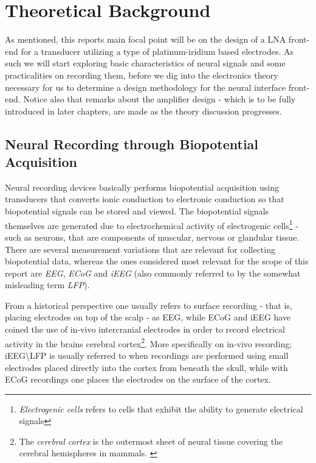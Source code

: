 \chapter{Theoretical Background}
\label{chap:two}
 
 As mentioned, this reports main focal point will be on the design of a \acs{LNA} front-end for a transducer utilizing a type of platinum-iridium based electrodes. 
 As such we will start exploring basic characteristics of neural signals and some practicalities on recording them, before we dig into the electronics theory necessary for us to determine a design methodology for the neural interface front-end. Notice also that remarks about the amplifier design - which is to be fully introduced in later chapters, are made as the theory discussion progresses.
 
  \section{Neural Recording through Biopotential Acquisition}
  \label{sec:biopotential-aquisition}
  Neural recording devices basically performs biopotential acquisition using transducers that converts ionic conduction to electronic conduction so that biopotential 
  signals can be stored and viewed. The biopotential signals themselves are generated due to electrochemical activity of electrogenic cells\footnote{\emph{Electrogenic cells} 
  refers to cells that exhibit the ability to generate electrical signals\cite{GBM8320-2013-electrodes-ch8-pt1}} - such as neurons, that are components of muscular, 
  nervous or glandular tissue. There are several measurement variations that are relevant for collecting biopotential data, whereas the ones considered most relevant 
  for the scope of this report are \emph{\acf{EEG}}, \emph{\acf{ECoG}} and \emph{\acf{iEEG}} (also commonly referred to by the somewhat misleading term \emph{\acf{LFP}}).
  
    From a historical perspective one usually refers to surface recording - that is, placing electrodes on top of the scalp - as \acs{EEG}, while \acs{ECoG} and \acs{iEEG} have coined the use of in-vivo
  intercranial electrodes in order to record electrical activity in the brains cerebral cortex\footnote{The \emph{cerebral cortex} is the outermost sheet of neural tissue covering the cerebral hemispheres in mammals. \cite{marcus2014future}}.
	More specifically on in-vivo recording; \acs{iEEG}\textbackslash\acs{LFP} is usually referred to when recordings are performed using small electrodes placed directly into the cortex from beneath the skull,
  while with \acs{ECoG} recordings one places the electrodes on the surface of the cortex.%
  
